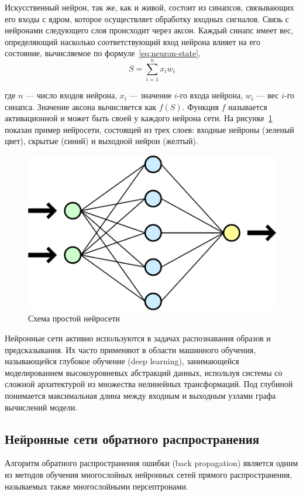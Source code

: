 \documentclass[a4paper,14pt]{extarticle} %
\begin{document}
Искусственный нейрон, так же, как и живой, состоит из синапсов, связывающих его входы с ядром, которое осуществляет обработку входных сигналов. Связь с нейронами следующего слоя происходит через аксон. Каждый синапс имеет вес, определяющий насколько соответствующий вход нейрона влияет на его состояние, вычисляемое по формуле~\ref{eq:neuron-state}, 
\begin{equation}
S = \sum_{i=1}^{n}x_iw_i
\label{eq:neuron-state}
\end{equation} 

\noindent где $n$ --- число входов нейрона, $x_i$ --- значение $i$-го входа нейрона, $w_i$ --- вес $i$-го синапса. Значение аксона вычисляется как $f(S)$. Функция $f$ называется активационной и может быть своей у каждого нейрона сети. На рисунке~\ref{fig:Neuralnetwork} показан пример нейросети, состоящей из трех слоев: входные нейроны (зеленый цвет), скрытые (синий) и выходной нейрон (желтый).
\begin{figure}[H]
\centering
\includegraphics[width=0.7\linewidth]{./pictures/Neuralnetwork}
\caption{Схема простой нейросети}
\label{fig:Neuralnetwork}
\end{figure}

Нейронные сети активно используются в задачах распознавания образов и предсказывания. Их часто применяют в области машинного обучения, называющейся глубокое обучение (deep learning), занимающейся моделированием высокоуровневых абстракций данных, используя системы со сложной архитектурой из множества нелинейных трансформаций. Под глубиной понимается максимальная длина между входным и выходным узлами графа вычислений модели.

\subsection{Нейронные сети обратного распространения}
\hspace{\parindent} Алгоритм обратного распространения ошибки (back propagation) является одним из методов обучения многослойных нейронных сетей прямого распространения, называемых также многослойными персептронами.
\end{document}
